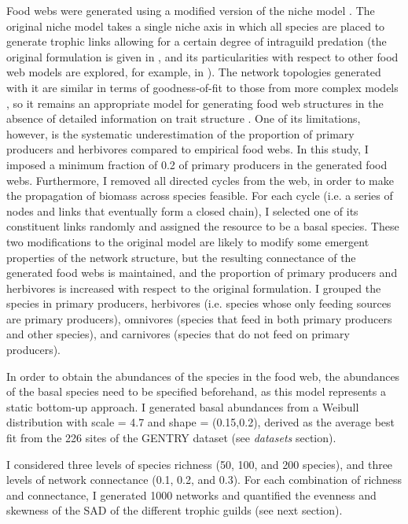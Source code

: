 Food webs were generated using a modified version of the niche model \citep{Williams2000}. The original niche model takes a single niche axis in which all species are placed to generate trophic links allowing for a certain degree of intraguild predation (the original formulation is given in \citealt{Williams2000}, and its particularities with respect to other food web models are explored, for example, in \citealt{Dunne2006}). The network topologies generated with it are similar in terms of goodness-of-fit to those from more complex models \citep{Williams2008}, so it remains an appropriate model for generating food web structures in the absence of detailed information on trait structure \citep{Gravel2016}. One of its limitations, however, is the systematic underestimation of the proportion of primary producers and herbivores compared to empirical food webs. In this study, I imposed a minimum fraction of 0.2 of primary producers in the generated food webs. Furthermore, I removed all directed cycles from the web, in order to make the propagation of biomass across species feasible. For each cycle (i.e. a series of nodes and links that eventually form a closed chain), I selected one of its constituent links randomly and assigned the resource to be a basal species. These two modifications to the original model are likely to modify some emergent properties of the network structure, but the resulting connectance of the generated food webs is maintained, and the proportion of primary producers and herbivores is increased with respect to the original formulation. I grouped the species in primary producers, herbivores (i.e. species whose only feeding sources are primary producers), omnivores (species that feed in both primary producers and other species), and carnivores (species that do not feed on primary producers).

In order to obtain the abundances of the species in the food web, the abundances of the basal species need to be specified beforehand, as this model represents a static bottom-up approach. I generated basal abundances from a Weibull distribution with scale = 4.7 and shape = (0.15,0.2), derived as the average best fit from the 226 sites of the GENTRY dataset (see \textit{datasets} section).

I considered three levels of species richness (50, 100, and 200 species), and three levels of network connectance (0.1, 0.2, and 0.3). For each combination of richness and connectance, I generated 1000 networks and quantified the evenness and skewness of the SAD of the different trophic guilds (see next section).


